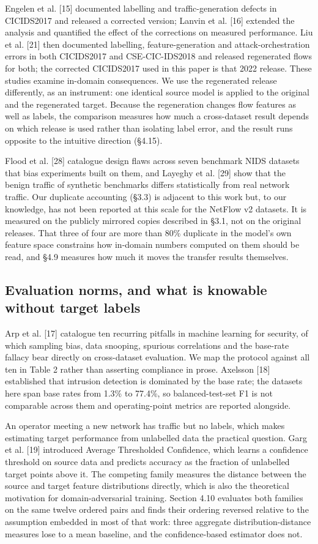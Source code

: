 \documentclass[11pt,a4paper]{article}
\begin{document}
Engelen et al. [15] documented labelling and traffic-generation defects in CICIDS2017 and released a corrected version; Lanvin et al. [16] extended the analysis and quantified the effect of the corrections on measured performance. Liu et al. [21] then documented labelling, feature-generation and attack-orchestration errors in both CICIDS2017 and CSE-CIC-IDS2018 and released regenerated flows for both; the corrected CICIDS2017 used in this paper is that 2022 release. These studies examine in-domain consequences. We use the regenerated release differently, as an instrument: one identical source model is applied to the original and the regenerated target. Because the regeneration changes flow features as well as labels, the comparison measures how much a cross-dataset result depends on which release is used rather than isolating label error, and the result runs opposite to the intuitive direction (§4.15).

Flood et al. [28] catalogue design flaws across seven benchmark NIDS datasets that bias experiments built on them, and Layeghy et al. [29] show that the benign traffic of synthetic benchmarks differs statistically from real network traffic. Our duplicate accounting (§3.3) is adjacent to this work but, to our knowledge, has not been reported at this scale for the NetFlow v2 datasets. It is measured on the publicly mirrored copies described in §3.1, not on the original releases. That three of four are more than 80\% duplicate in the model's own feature space constrains how in-domain numbers computed on them should be read, and §4.9 measures how much it moves the transfer results themselves.

\subsection{Evaluation norms, and what is knowable without target labels}

Arp et al. [17] catalogue ten recurring pitfalls in machine learning for security, of which sampling bias, data snooping, spurious correlations and the base-rate fallacy bear directly on cross-dataset evaluation. We map the protocol against all ten in Table 2 rather than asserting compliance in prose. Axelsson [18] established that intrusion detection is dominated by the base rate; the datasets here span base rates from 1.3\% to 77.4\%, so balanced-test-set F1 is not comparable across them and operating-point metrics are reported alongside.

An operator meeting a new network has traffic but no labels, which makes estimating target performance from unlabelled data the practical question. Garg et al. [19] introduced Average Thresholded Confidence, which learns a confidence threshold on source data and predicts accuracy as the fraction of unlabelled target points above it. The competing family measures the distance between the source and target feature distributions directly, which is also the theoretical motivation for domain-adversarial training. Section 4.10 evaluates both families on the same twelve ordered pairs and finds their ordering reversed relative to the assumption embedded in most of that work: three aggregate distribution-distance measures lose to a mean baseline, and the confidence-based estimator does not.
\end{document}
